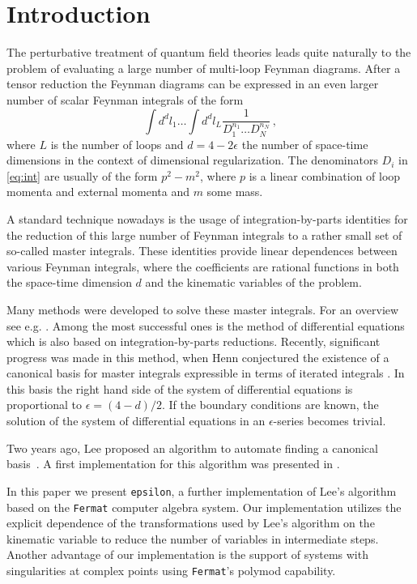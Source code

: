 \documentclass[12pt]{article}
\numberwithin{equation}{section}
\numberwithin{figure}{section}
\begin{document}
  \section{Introduction}
    The perturbative treatment of quantum field theories leads quite naturally to the problem of evaluating a large number of multi-loop Feynman diagrams.
    After a tensor reduction the Feynman diagrams can be expressed in an even larger number of scalar Feynman integrals of the form
    \begin{equation} \label{eq:int}
      \int d^dl_1 \dots \int d^dl_L \frac1{D_1^{n_1} \dots D_N^{n_N}}\,,
    \end{equation}
    where $L$ is the number of loops and $d=4-2\epsilon$ the number of space-time dimensions in the context of dimensional regularization.
    The denominators $D_i$ in \eqref{eq:int} are usually of the form $p^2 - m^2$, where $p$ is a linear combination of loop momenta and external momenta and $m$ some mass.

    A standard technique nowadays is the usage of integration-by-parts identities \cite{Tkachov:1981wb,Chetyrkin:1981qh} for the reduction of this large number of Feynman integrals to a rather small set of so-called master integrals.
    These identities provide linear dependences between various Feynman integrals, where the coefficients are rational functions in both the space-time dimension $d$ and the kinematic variables of the problem.

    Many methods were developed to solve these master integrals.
    For an overview see e.g. \cite{Smirnov:2012gma}.
    Among the most successful ones is the method of differential equations which is also based on integration-by-parts reductions\cite{Kotikov:1990kg,Kotikov:1991hm,Kotikov:1991pm}.
    Recently, significant progress was made in this method, when Henn conjectured the existence of a canonical basis for master integrals expressible in terms of iterated integrals \cite{Henn:2013pwa}.
    In this basis the right hand side of the system of differential equations is proportional to $\epsilon = (4-d)/2$.
    If the boundary conditions are known, the solution of the system of differential equations in an $\epsilon$-series becomes trivial.

    Two years ago, Lee proposed an algorithm to automate finding a canonical basis~\cite{Lee:2014ioa}.
    A first implementation for this algorithm was presented in \cite{Gituliar:2017vzm}.

    In this paper we present \texttt{epsilon}, a further implementation of Lee's algorithm based on the \texttt{Fermat}\cite{Lewis:fermat} computer algebra system.
    Our implementation utilizes the explicit dependence of the transformations used by Lee's algorithm on the kinematic variable to reduce the number of variables in intermediate steps.
    Another advantage of our implementation is the support of systems with singularities at complex points using \texttt{Fermat}'s polymod capability.
\end{document}

